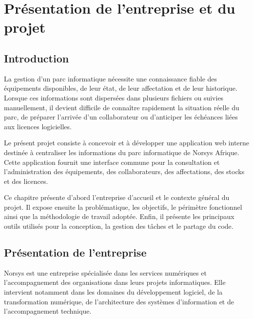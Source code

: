 \documentclass{rapportENSIAS}
\begin{document}

\newpage
\tabledematieres

\newpage
\listoffigures

\newpage
\listoftables


\chapter{Présentation de l'entreprise et du projet}

\section{Introduction}

La gestion d’un parc informatique nécessite une connaissance fiable des équipements disponibles, de leur état, de leur affectation et de leur historique. Lorsque ces informations sont dispersées dans plusieurs fichiers ou suivies manuellement, il devient difficile de connaître rapidement la situation réelle du parc, de préparer l’arrivée d’un collaborateur ou d’anticiper les échéances liées aux licences logicielles.

Le présent projet consiste à concevoir et à développer une application web interne destinée à centraliser les informations du parc informatique de Norsys Afrique. Cette application fournit une interface commune pour la consultation et l’administration des équipements, des collaborateurs, des affectations, des stocks et des licences.

Ce chapitre présente d’abord l’entreprise d’accueil et le contexte général du projet. Il expose ensuite la problématique, les objectifs, le périmètre fonctionnel ainsi que la méthodologie de travail adoptée. Enfin, il présente les principaux outils utilisés pour la conception, la gestion des tâches et le partage du code.

\section{Présentation de l'entreprise}

Norsys est une entreprise spécialisée dans les services numériques et l’accompagnement des organisations dans leurs projets informatiques. Elle intervient notamment dans les domaines du développement logiciel, de la transformation numérique, de l’architecture des systèmes d’information et de l’accompagnement technique.
\end{document}
